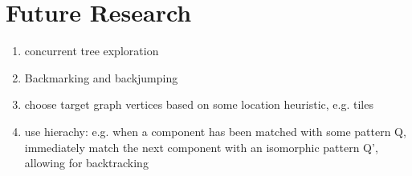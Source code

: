 \chapter{Future Research}

\begin{enumerate}
\item concurrent tree exploration
\item Backmarking and backjumping
\item choose target graph vertices based on some location heuristic, e.g. tiles
\item use hierachy: e.g. when a component has been matched with some pattern Q, immediately match the next component with an isomorphic pattern Q', allowing for backtracking
\end{enumerate}